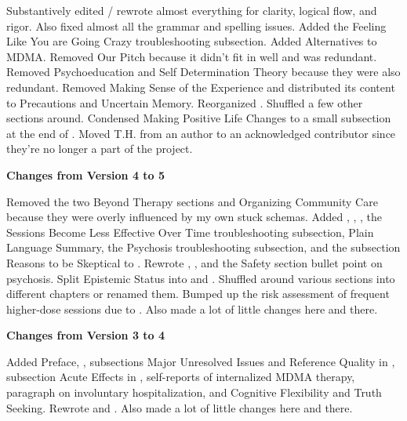 \documentclass[11pt,oneside]{book}
\newcommand{\frontsection}[1]{%
  \par\vspace{2\baselineskip}%
  {\centering\sffamily\bfseries\large #1\par}%
  \nopagebreak\vspace{\baselineskip}%
}
\begin{document}
Substantively edited / rewrote almost everything for clarity, logical flow, and rigor. Also fixed almost all the grammar and spelling issues. Added the Feeling Like You are Going Crazy troubleshooting subsection. Added Alternatives to MDMA. Removed Our Pitch because it didn't fit in well and was redundant. Removed Psychoeducation and Self Determination Theory because they were also redundant. Removed Making Sense of the Experience and distributed its content to Precautions and Uncertain Memory. Reorganized . Shuffled a few other sections around. Condensed Making Positive Life Changes to a small subsection at the end of . Moved T.H. from an author to an acknowledged contributor since they're no longer a part of the project.

\frontsection{Changes from Version 4 to 5}
Removed the two Beyond Therapy sections and Organizing Community Care because they were overly influenced by my own stuck schemas. Added , , , the Sessions Become Less Effective Over Time troubleshooting subsection, Plain Language Summary, the Psychosis troubleshooting subsection, and the subsection Reasons to be Skeptical to . Rewrote , , and the Safety section bullet point on psychosis. Split Epistemic Status into  and . Shuffled around various sections into different chapters or renamed them. Bumped up the risk assessment of frequent higher-dose sessions due to \textcite{corayMemory}. Also made a lot of little changes here and there.

\frontsection{Changes from Version 3 to 4}
Added Preface, , subsections Major Unresolved Issues and Reference Quality in , subsection Acute Effects in , self-reports of internalized MDMA therapy, paragraph on involuntary hospitalization, and Cognitive Flexibility and Truth Seeking. Rewrote  and . Also made a lot of little changes here and there.

\clearpage

\tableofcontents
\end{document}
